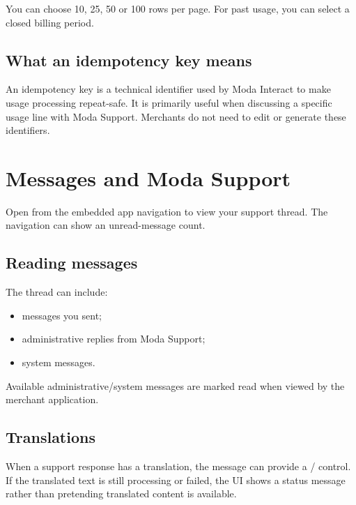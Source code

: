 You can choose 10, 25, 50 or 100 rows per page. For past usage, you can select a closed billing period.


\section{What an idempotency key means}
An idempotency key is a technical identifier used by Moda Interact to make usage processing repeat-safe. It is primarily useful when discussing a specific usage line with Moda Support. Merchants do not need to edit or generate these identifiers.

\chapter{Messages and Moda Support}

Open  from the embedded app navigation to view your support thread. The navigation can show an unread-message count.


\section{Reading messages}
The thread can include:
\begin{itemize}
  \item messages you sent;
  \item administrative replies from Moda Support;
  \item system messages.
\end{itemize}

Available administrative/system messages are marked read when viewed by the merchant application.

\section{Translations}
When a support response has a translation, the message can provide a  /  control. If the translated text is still processing or failed, the UI shows a status message rather than pretending translated content is available.


